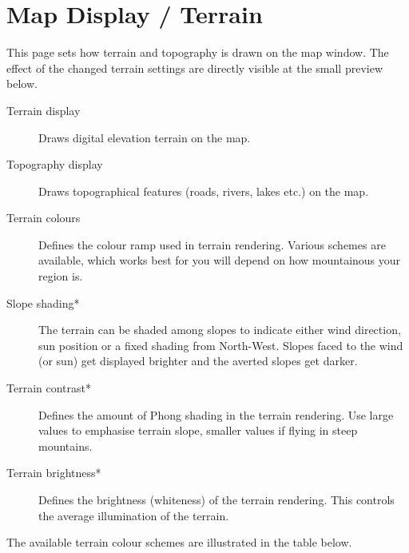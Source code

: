 \section{Map Display / Terrain}\label{sec:terrain-display}

This page sets how terrain and topography is drawn on the map window. The effect of the 
changed terrain settings are directly visible at the small preview below.

\begin{description}
\item[Terrain display]  Draws digital elevation terrain on the map.
\item[Topography display]  Draws topographical features (roads, rivers, lakes etc.) on
  the map.
\item[Terrain colours]  Defines the colour ramp used in terrain rendering.  Various 
  schemes are available, which works best for you will depend on how mountainous your region is.
\item[Slope shading*]  \label{conf:shading} The terrain can be shaded among slopes 
  to indicate either wind direction, sun position or a fixed shading from North-West. 
  Slopes faced to the wind (or sun) get displayed brighter and the averted slopes get darker.
\item[Terrain contrast*]  Defines the amount of Phong shading in the terrain rendering. 
  Use large values to emphasise terrain slope, smaller values if flying in steep mountains.
\item[Terrain brightness*]  Defines the brightness (whiteness) of the terrain rendering. 
  This controls the average illumination of the terrain.
\end{description}


The available terrain colour schemes are illustrated in the table below.

